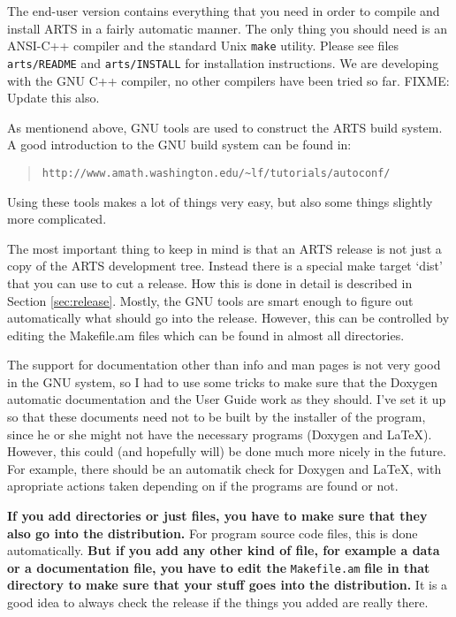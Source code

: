 The end-user version contains everything that you need in order to
compile and install ARTS in a fairly automatic manner. The only
thing you should need is an ANSI-C++ compiler and the standard Unix
\verb|make| utility. Please see files \verb|arts/README| and
\verb|arts/INSTALL| for installation instructions. We are developing
with the GNU C++ compiler, no other compilers have been tried so
far. FIXME: Update this also.


As mentionend above, GNU tools are used to construct the ARTS
build system. A good introduction to the GNU build system can be found in:
\begin{quote}
  \verb|http://www.amath.washington.edu/~lf/tutorials/autoconf/|
\end{quote}
Using these tools makes a lot of things very easy, but also some
things slightly more complicated.

The most important thing to keep in mind is that an ARTS release
is not just a copy of the ARTS development tree. Instead there is a
special make target `dist' that you can use to cut a release. How this
is done in detail is described in Section \ref{sec:release}. Mostly,
the GNU tools are smart enough to figure out automatically what should
go into the release. However, this can be controlled by editing the
Makefile.am files which can be found in almost all directories.

The support for documentation other than info and man pages is not
very good in the GNU system, so I had to use some tricks to make sure
that the Doxygen automatic documentation and the User Guide work as they
should. I've set it up so that these documents need not to be built by
the installer of the program, since he or she might not have the
necessary programs (Doxygen and LaTeX). However, this could (and
hopefully will) be done much more nicely in the future. For example,
there should be an automatik check for Doxygen and LaTeX, with
apropriate actions taken depending on if the programs are found or
not. 

\textbf{If you add directories or just files, you have to make sure
  that they also go into the distribution.} For program source code
files, this is done automatically. \textbf{But if you add any other
  kind of file, for example a data or a documentation file, you have
  to edit the} \verb|Makefile.am| \textbf{file in that directory to make sure
  that your stuff goes into the distribution.} It is a good idea to
always check the release if the things you added are really there.

